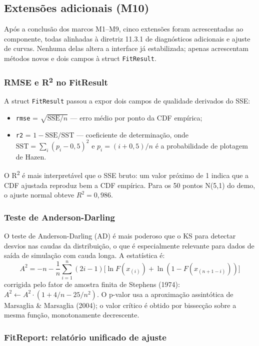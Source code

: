\subsection{Extensões adicionais (M10)}
\label{sec:m10}

Após a conclusão dos marcos M1--M9, cinco extensões foram acrescentadas ao componente, todas alinhadas à diretriz 11.3.1 de diagnósticos adicionais e ajuste de curvas. Nenhuma delas altera a interface já estabilizada; apenas acrescentam métodos novos e dois campos à struct \texttt{FitResult}.

\subsubsection*{RMSE e R\textsuperscript{2} no FitResult}

A struct \texttt{FitResult} passou a expor dois campos de qualidade derivados do SSE:

\begin{itemize}
    \item \texttt{rmse} = $\sqrt{\text{SSE}/n}$ — erro médio por ponto da CDF empírica;
    \item \texttt{r2} = $1 - \text{SSE}/\text{SST}$ — coeficiente de determinação, onde $\text{SST} = \sum_i (p_i - 0{,}5)^2$ e $p_i = (i+0{,}5)/n$ é a probabilidade de plotagem de Hazen.
\end{itemize}

O R\textsuperscript{2} é mais interpretável que o SSE bruto: um valor próximo de 1 indica que a CDF ajustada reproduz bem a CDF empírica. Para os 50 pontos N(5,1) do demo, o ajuste normal obteve $R^2 = 0{,}986$.

\subsubsection*{Teste de Anderson-Darling}

O teste de Anderson-Darling (AD) é mais poderoso que o KS para detectar desvios nas caudas da distribuição, o que é especialmente relevante para dados de saída de simulação com cauda longa. A estatística é:
\[
A^2 = -n - \frac{1}{n}\sum_{i=1}^{n}(2i-1)\bigl[\ln F(x_{(i)}) + \ln(1 - F(x_{(n+1-i)}))\bigr]
\]
corrigida pelo fator de amostra finita de Stephens (1974): $A^2 \leftarrow A^2 \cdot (1 + 4/n - 25/n^2)$. O p-valor usa a aproximação assintótica de Marsaglia \& Marsaglia (2004); o valor crítico é obtido por bissecção sobre a mesma função, monotonamente decrescente.

\subsubsection*{FitReport: relatório unificado de ajuste}


